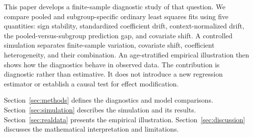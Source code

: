 This paper develops a finite-sample diagnostic study of that question. We compare pooled and subgroup-specific ordinary least squares fits using five quantities: sign stability, standardized coefficient drift, context-normalized drift, the pooled-versus-subgroup prediction gap, and covariate shift. A controlled simulation separates finite-sample variation, covariate shift, coefficient heterogeneity, and their combination. An age-stratified empirical illustration then shows how the diagnostics behave in observed data. The contribution is diagnostic rather than estimative. It does not introduce a new regression estimator or establish a causal test for effect modification.

Section~\ref{sec:methods} defines the diagnostics and model comparisons. Section~\ref{sec:simulation} describes the simulation and its results. Section~\ref{sec:realdata} presents the empirical illustration. Section~\ref{sec:discussion} discusses the mathematical interpretation and limitations.